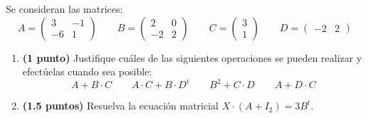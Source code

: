 
Se consideran las matrices:
\[
A=\begin{pmatrix}3&-1\\-6&1\end{pmatrix}
\qquad B=\begin{pmatrix}2&0\\-2&2\end{pmatrix}
\qquad C=\begin{pmatrix}3\\1\end{pmatrix}
\qquad D=\begin{pmatrix}-2&2\end{pmatrix}
\]
\begin{enumerate}[label=\alph*),leftmargin=2.4em]
  \item \textbf{(1 punto)} Justifique cuáles de las siguientes operaciones se pueden realizar y efectúelas cuando sea posible:
  \[
  A+B\cdot C\qquad A\cdot C+B\cdot D^t\qquad B^2+C\cdot D\qquad A+D\cdot C
  \]
  \item \textbf{(1.5 puntos)} Resuelva la ecuación matricial \(X\cdot(A+I_2)=3B^t\).
\end{enumerate}
